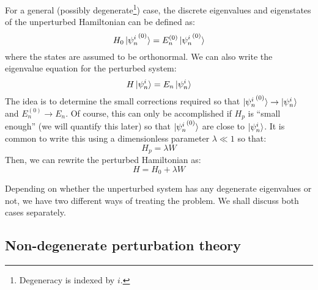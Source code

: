 For a general (possibly degenerate\footnote{Degeneracy is indexed by $i$.}) case, the discrete eigenvalues and eigenstates of the unperturbed Hamiltonian can be defined as:
\begin{equation}
    H_0 \ket{{\psi_n^i}^{(0)}} = E_n^{(0)} \ket{{\psi_n^i}^{(0)}} 
\end{equation}
where the states are assumed to be orthonormal. We can also write the eigenvalue equation for the perturbed system:
\begin{equation}
    H \ket{\psi_n^i} = E_n\ket{\psi_n^i} 
\end{equation}
The idea is to determine the small corrections required so that $\ket{{\psi_n^i}^{(0)}}\to \ket{\psi_n^i}$ and $E_n^{(0)}\to E_n$. Of course, this can only be accomplished if $H_p$ is ``small enough'' (we will quantify this later) so that $\ket{{\psi_n^i}^{(0)}}$ are close to $\ket{\psi_n^i}$. It is common to write this using a dimensionless parameter $\lambda \ll 1$ so that:
\begin{equation}
    H_p = \lambda W
\end{equation}
Then, we can rewrite the perturbed Hamiltonian as:
\begin{equation}
    H = H_0 + \lambda W
\end{equation}

Depending on whether the unperturbed system has any degenerate eigenvalues or not, we have two different ways of treating the problem. We shall discuss both cases separately.

\subsection{Non-degenerate perturbation theory}


